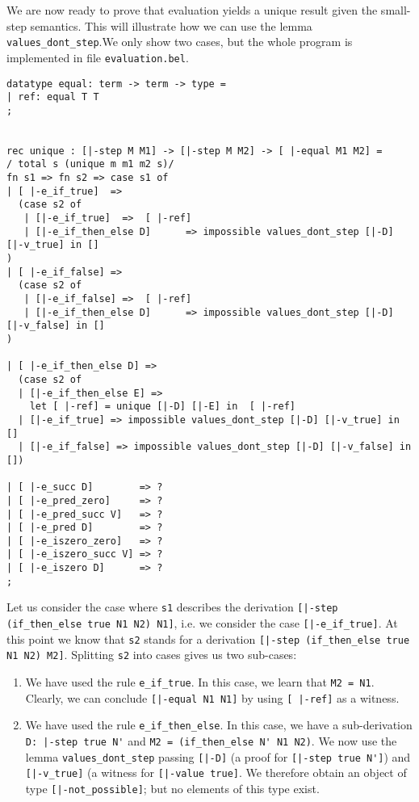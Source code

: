 We are now ready to prove that evaluation yields a unique result given the
small-step semantics. This will illustrate how we can use the lemma \lstinline!values_dont_step!.We only show two cases, but the whole program is
implemented in file \lstinline!evaluation.bel!.

\begin{lstlisting}
datatype equal: term -> term -> type = 
| ref: equal T T
;


rec unique : [|-step M M1] -> [|-step M M2] -> [ |-equal M1 M2] =
/ total s (unique m m1 m2 s)/
fn s1 => fn s2 => case s1 of 
| [ |-e_if_true]  => 
  (case s2 of 
   | [|-e_if_true]  =>  [ |-ref]
   | [|-e_if_then_else D]      => impossible values_dont_step [|-D] [|-v_true] in []
)
| [ |-e_if_false] => 
  (case s2 of 
   | [|-e_if_false] =>  [ |-ref]
   | [|-e_if_then_else D]      => impossible values_dont_step [|-D] [|-v_false] in []
)

| [ |-e_if_then_else D] => 
  (case s2 of 
  | [|-e_if_then_else E] =>
    let [ |-ref] = unique [|-D] [|-E] in  [ |-ref]
  | [|-e_if_true] => impossible values_dont_step [|-D] [|-v_true] in []
  | [|-e_if_false] => impossible values_dont_step [|-D] [|-v_false] in [])

| [ |-e_succ D]        => ?
| [ |-e_pred_zero]     => ?
| [ |-e_pred_succ V]   => ?
| [ |-e_pred D]        => ?
| [ |-e_iszero_zero]   => ?
| [ |-e_iszero_succ V] => ?
| [ |-e_iszero D]      => ?
;
\end{lstlisting}

Let us consider the case where \lstinline!s1! describes the derivation
\lstinline![|-step (if_then_else true N1 N2) N1]!, i.e. we consider the case 
\lstinline![|-e_if_true]!. At this point we know that \lstinline!s2! stands
for a derivation \lstinline![|-step (if_then_else true N1 N2) M2]!. Splitting
\lstinline!s2! into cases gives us two sub-cases: 
\begin{enumerate}
\item We have used the rule
\lstinline!e_if_true!. In this case, we learn that 
\lstinline!M2 = N1!. Clearly, we can conclude \lstinline![|-equal N1 N1]! by
using \lstinline![ |-ref]! as a witness.

\item We have used the rule \lstinline!e_if_then_else!. In this case, we have a
  sub-derivation \lstinline!D: |-step true N'! and \lstinline!M2 = (if_then_else N' N1 N2)!.
We now use the lemma \lstinline!values_dont_step! passing \lstinline![|-D]! (a
proof for \lstinline![|-step true N']!) and \lstinline![|-v_true]! (a witness
for \lstinline![|-value true]!. 
We therefore obtain an object of type \lstinline![|-not_possible]!; but no
elements of this type exist.
\end{enumerate}


